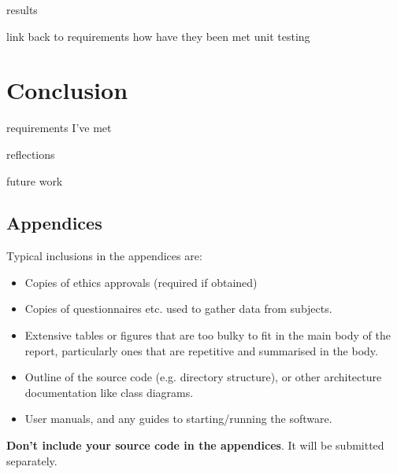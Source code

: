 \documentclass{l4proj}
\begin{document}
results


link back to requirements 
how have they been met
unit testing




\chapter{Conclusion}


requirements I've met


reflections 

future work

%
% 

\begin{appendices}

    \chapter{Appendices}
    
    Typical inclusions in the appendices are:
    
    \begin{itemize}
        \item
              Copies of ethics approvals (required if obtained)
        \item
              Copies of questionnaires etc. used to gather data from subjects.
        \item
              Extensive tables or figures that are too bulky to fit in the main body of
              the report, particularly ones that are repetitive and summarised in the body.
              
        \item Outline of the source code (e.g. directory structure), or other architecture documentation like class diagrams.
              
        \item User manuals, and any guides to starting/running the software.
              
    \end{itemize}
    
    \textbf{Don't include your source code in the appendices}. It will be
    submitted separately.
    
\end{appendices}






\end{document}
